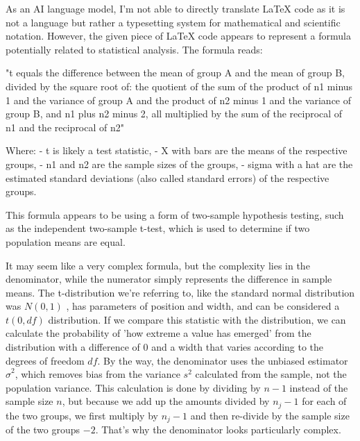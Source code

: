 \documentclass{ltjsbook}
\begin{document}
As an AI language model, I'm not able to directly translate LaTeX code as it is not a language but rather a typesetting system for mathematical and scientific notation. However, the given piece of LaTeX code appears to represent a formula potentially related to statistical analysis. The formula reads:

"t equals the difference between the mean of group A and the mean of group B, divided by the square root of: the quotient of the sum of the product of n1 minus 1 and the variance of group A and the product of n2 minus 1 and the variance of group B, and n1 plus n2 minus 2, all multiplied by the sum of the reciprocal of n1 and the reciprocal of n2"

Where:
- t is likely a test statistic,
- X with bars are the means of the respective groups,
- n1 and n2 are the sample sizes of the groups,
- sigma with a hat are the estimated standard deviations (also called standard errors) of the respective groups.

This formula appears to be using a form of two-sample hypothesis testing, such as the independent two-sample t-test, which is used to determine if two population means are equal.

It may seem like a very complex formula, but the complexity lies in the denominator, while the numerator simply represents the difference in sample means. The t-distribution we're referring to, like the standard normal distribution was $N(0,1)$ , has parameters of position and width, and can be considered a $t(0,df)$ distribution. If we compare this statistic with the distribution, we can calculate the probability of 'how extreme a value has emerged' from the distribution with a difference of $0$ and a width that varies according to the degrees of freedom $df$.
By the way, the denominator uses the unbiased estimator $\hat{\sigma}^2$, which removes bias from the variance $s^2$ calculated from the sample, not the population variance. This calculation is done by dividing by $n-1$ instead of the sample size $n$, but because we add up the amounts divided by $n_j-1$ for each of the two groups, we first multiply by $n_j-1$ and then re-divide by the sample size of the two groups $-2$. That's why the denominator looks particularly complex.
\end{document}
